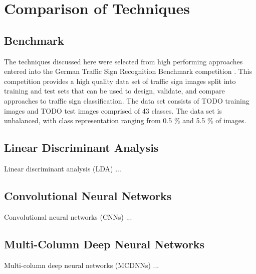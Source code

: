 \documentclass[letterpaper,twocolumn,10pt]{article}
\begin{document}
\section{Comparison of Techniques}

\subsection{Benchmark}

The techniques discussed here were selected from high performing approaches entered into the German Traffic Sign Recognition Benchmark competition \cite{stallkamp_german_2011, stallkamp_man_2012}. This competition provides a high quality data set of traffic sign images split into training and test sets that can be used to design, validate, and compare approaches to traffic sign classification. The data set consists of TODO training images and TODO test images comprised of 43 classes. The data set is unbalanced, with class representation ranging from 0.5 \% and 5.5 \% of images.


\subsection{Linear Discriminant Analysis}

Linear discriminant analysis (LDA) ...


\subsection{Convolutional Neural Networks}

Convolutional neural networks (CNNs) ...


\subsection{Multi-Column Deep Neural Networks}

Multi-column deep neural networks (MCDNNs) ...
\end{document}
